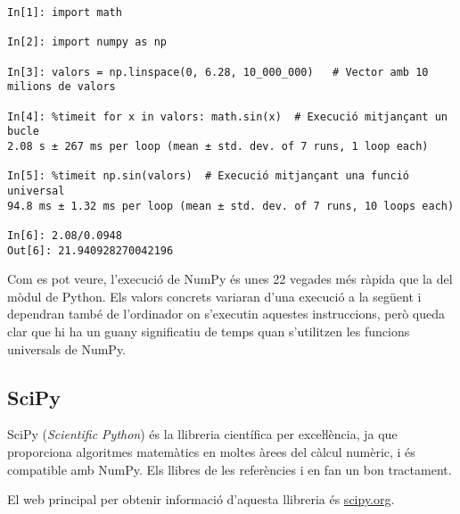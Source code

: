 \begin{lstlisting}
In[1]: import math

In[2]: import numpy as np

In[3]: valors = np.linspace(0, 6.28, 10_000_000)   # Vector amb 10 milions de valors

In[4]: %timeit for x in valors: math.sin(x)  # Execució mitjançant un bucle
2.08 s ± 267 ms per loop (mean ± std. dev. of 7 runs, 1 loop each)

In[5]: %timeit np.sin(valors)  # Execució mitjançant una funció universal
94.8 ms ± 1.32 ms per loop (mean ± std. dev. of 7 runs, 10 loops each)

In[6]: 2.08/0.0948
Out[6]: 21.940928270042196
\end{lstlisting}

Com es pot veure, l'execució de NumPy és unes 22 vegades més ràpida que la del mòdul  de Python. Els valors concrets variaran d'una execució a la següent i dependran també de l'ordinador on s'executin aquestes instruccions, però queda clar que hi ha un guany significatiu de temps quan s'utilitzen les funcions universals de NumPy.


\subsection{SciPy}

SciPy (\textit{Scientific Python}) és la llibreria científica per exceŀlència, ja que proporciona algoritmes  matemàtics en moltes àrees del càlcul numèric, i és compatible amb NumPy. Els llibres de les referències \cite{JOH} i \cite{HIL} en fan un bon tractament.

El  web principal per obtenir informació d'aquesta llibreria és \href{https://scipy.org/}{scipy.org}.


